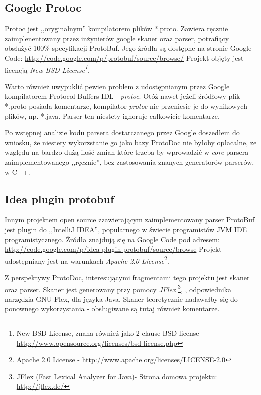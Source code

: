 \documentclass[pdflatex,11pt]{aghdpl}
\begin{document}
\subsection{Google Protoc}

Protoc jest ,,oryginalnym'' kompilatorem plików *.proto. Zawiera ręcznie zaimplenentowany przez inżynierów google skaner oraz parser,
potrafiący obsłużyć 100\% specyfikacji ProtoBuf. Jego źródła są dostępne na stronie Google Code: \href{http://code.google.com/p/protobuf/source/browse/}{http://code.google.com/p/protobuf/source/browse/}
Projekt objęty jest licencją \textit{New BSD License\footnote{New BSD License, znana również jako 2-clause BSD license - \href{http://www.opensource.org/licenses/bsd-license.php}{http://www.opensource.org/licenses/bsd-license.php}}}.

Warto również uwypuklić pewien problem z udostępnianym przez Google kompilatorem Protocol Buffers IDL - \textit{protoc}.
Otóź nawet jeżeli źródłowy plik *.proto posiada komentarze, kompilator \textit{protoc} nie przeniesie je do wynikowych plików, np. *.java.
Parser ten niestety ignoruje całkowicie komentarze. 

Po wstępnej analizie kodu parsera dostarczanego przez Google doszedłem do wniosku, 
że niestety wykorzstanie go jako bazy ProtoDoc nie byłoby opłacalne, ze względu na bardzo dużą ilość zmian które trzeba by wprowadzić w \textit{core} parsera
 - zaimplementowanego ,,ręcznie'', bez zastosowania znanych generatorów parserów, w C++.

\subsection{Idea plugin protobuf}

Innym projektem open source zzawierającym zaimplementowany parser ProtoBuf jest plugin do ,,IntelliJ IDEA'', popularnego w świecie programistów JVM 
IDE programistycznego. Źródła znajdują się na Google Code pod adresem: \href{http://code.google.com/p/idea-plugin-protobuf/source/browse}{http://code.google.com/p/idea-plugin-protobuf/source/browse}
Projekt udostępniany jest na warunkach \textit{Apache 2.0 License}\footnote{Apache 2.0 License - \href{http://www.apache.org/licenses/LICENSE-2.0}{http://www.apache.org/licenses/LICENSE-2.0}}.

Z perspektywy ProtoDoc, interesującymi fragmentami tego projektu jest skaner oraz parser. 
Skaner jest generowany przy pomocy \textit{JFlex} \footnote{JFlex (Fast Lexical Analyzer for Java)- Strona domowa projektu: \href{http://jflex.de/}{http://jflex.de/}},
, odpowiednika narzędzia GNU Flex, dla języka Java. Skaner teoretycznie nadawałby się do ponownego wykorzystania - obsługiwane są tutaj również komentarze.
\end{document}
